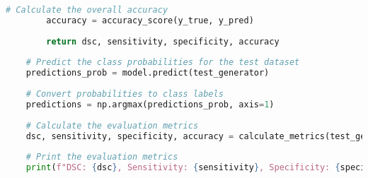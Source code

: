 \begin{lstlisting}[language=Python]
        # Calculate the overall accuracy
        accuracy = accuracy_score(y_true, y_pred)
    
        return dsc, sensitivity, specificity, accuracy
    
    # Predict the class probabilities for the test dataset
    predictions_prob = model.predict(test_generator)
    
    # Convert probabilities to class labels
    predictions = np.argmax(predictions_prob, axis=1)
    
    # Calculate the evaluation metrics
    dsc, sensitivity, specificity, accuracy = calculate_metrics(test_generator.classes, predictions)
    
    # Print the evaluation metrics
    print(f"DSC: {dsc}, Sensitivity: {sensitivity}, Specificity: {specificity}, Accuracy: {accuracy}")
\end{lstlisting}



